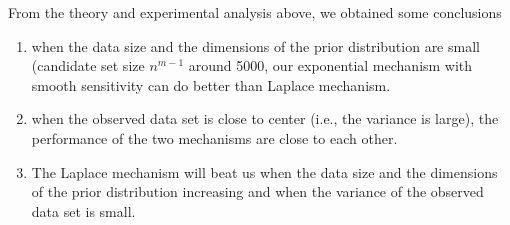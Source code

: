 From the theory and experimental analysis above, we obtained some conclusions
\begin{enumerate}
	\item when the data size and the dimensions of the prior distribution are small (candidate set size $n^{m-1}$ around 5000, our exponential mechanism with smooth sensitivity can do better than Laplace mechanism. 

	\item when the observed data set is close to center (i.e., the variance is large), the performance of the two mechanisms are close to each other.

	\item The Laplace mechanism will beat us when the data size and the dimensions of the prior distribution increasing and when the variance of the observed data set is small.
\end{enumerate}






